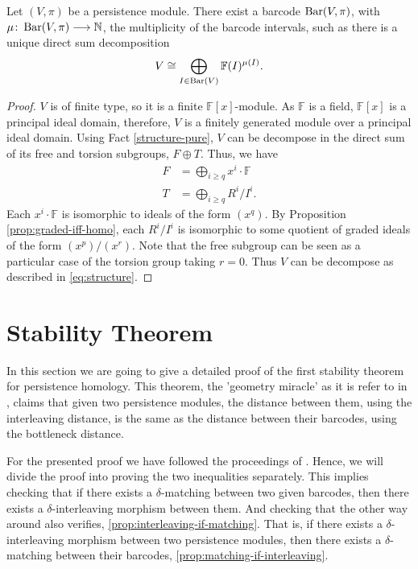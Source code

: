 \begin{theorem}[Structure] \cite[Proposition 4.8]{wang} \label{structure}
    Let $ (V, \pi) $ be a persistence module. There exist a barcode $ \operatorname{Bar}(V, \pi) $, with $ \mu \colon \operatorname{Bar} (V, \pi) \longrightarrow \mathbb N $, the multiplicity of the barcode intervals, such as there is a unique direct sum decomposition
    \begin{align}
        V \cong \bigoplus_{I \in  \operatorname{Bar} (V)} \mathbb F (I)^{\mu (I)}. \label{eq:structure}
    \end{align}
\end{theorem}
\begin{proof}
    $ V $ is of finite type, so it is a finite $ \mathbb F[x] $-module. As $ \mathbb F $ is a field, $ \mathbb F[x] $ is a principal ideal domain, therefore, $ V $ is a finitely generated module over a principal ideal domain. Using Fact \ref{structure-pure}, $ V $ can be decompose in the direct sum of its free and torsion subgroups, $ F \oplus T $. Thus, we have
    \begin{align}
        F &= \bigoplus_{i\geq q} x^i \cdot \mathbb F \\
        T &= \bigoplus_{i\geq q} R^i / I^i.
    \end{align}
    Each $ x^i \cdot \mathbb F $ is isomorphic to ideals of the form $ (x^q) $. By Proposition \ref{prop:graded-iff-homo}, each $ R^i / I^i $ is isomorphic to some quotient of graded ideals of the form $ (x^p) / (x^r)$. Note that the free subgroup can be seen as a particular case of the torsion group taking $ r = 0 $. Thus $ V $ can be decompose as described in \eqref{eq:structure}.
\end{proof}

\newpage
\section{Stability Theorem}
In this section we are going to give a detailed proof of the first stability theorem for persistence homology. This theorem, the 'geometry miracle' as it is refer to in \cite{nanda}, claims that given two persistence modules, the distance between them, using the interleaving distance, is the same as the distance between their barcodes, using the bottleneck distance. 

For the presented proof we have followed the proceedings of \cite{polterovich}. Hence, we will divide the proof into proving the two inequalities separately. This implies checking that if there exists a $\delta$-matching between two given barcodes, then there exists a $\delta$-interleaving morphism between them. And checking that the other way around also verifies, \ref{prop:interleaving-if-matching}. That is, if there exists a $\delta$-interleaving morphism between two persistence modules, then there exists a $\delta$-matching between their barcodes, \ref{prop:matching-if-interleaving}.

